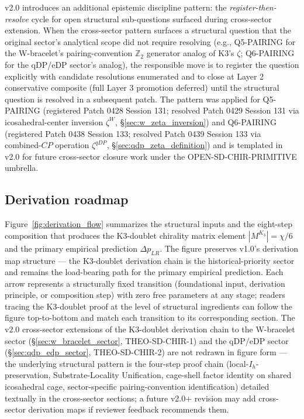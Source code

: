 \documentclass[11pt,letterpaper]{article}
\newcommand{\Kthree}{\ensuremath{K_3}}
\newcommand{\DeltapLR}{\Delta p_{LR}}
\begin{document}
v2.0 introduces an additional epistemic discipline pattern: the \emph{register-then-resolve} cycle for open structural sub-questions surfaced during cross-sector extension. When the cross-sector pattern surfaces a structural question that the original sector's analytical scope did not require resolving (e.g., Q5-PAIRING for the W-bracelet's pairing-convention $\mathbb{Z}_2$ generator analog of K3's $\zeta$; Q6-PAIRING for the qDP/eDP sector's analog), the responsible move is to register the question explicitly with candidate resolutions enumerated and to close at Layer 2 conservative composite (full Layer 3 promotion deferred) until the structural question is resolved in a subsequent patch. The pattern was applied for Q5-PAIRING (registered Patch 0428 Session 131; resolved Patch 0429 Session 131 via icosahedral-center inversion $\zeta^W$, \S\ref{sec:w_zeta_inversion}) and Q6-PAIRING (registered Patch 0438 Session 133; resolved Patch 0439 Session 133 via combined-$CP$ operation $\zeta^{qDP}$, \S\ref{sec:qdp_zeta_definition}) and is templated in v2.0 for future cross-sector closure work under the OPEN-SD-CHIR-PRIMITIVE umbrella.

\subsection{Derivation roadmap}\label{sec:roadmap}

Figure~\ref{fig:derivation_flow} summarizes the structural inputs and the eight-step composition that produces the K3-doublet chirality matrix element $|M^{\Kthree}| = \chi/6$ and the primary empirical prediction $\DeltapLR$. The figure preserves v1.0's derivation map structure --- the K3-doublet derivation chain is the historical-priority sector and remains the load-bearing path for the primary empirical prediction. Each arrow represents a structurally fixed transition (foundational input, derivation principle, or composition step) with zero free parameters at any stage; readers tracing the K3-doublet proof at the level of structural ingredients can follow the figure top-to-bottom and match each transition to its corresponding section. The v2.0 cross-sector extensions of the K3-doublet derivation chain to the W-bracelet sector (\S\ref{sec:w_bracelet_sector}, THEO-SD-CHIR-1) and the qDP/eDP sector (\S\ref{sec:qdp_edp_sector}, THEO-SD-CHIR-2) are not redrawn in figure form --- the underlying structural pattern is the four-step proof chain (local-$I_h$-preservation, Substrate-Locality Unification, cage-shell factor identity on shared icosahedral cage, sector-specific pairing-convention identification) detailed textually in the cross-sector sections; a future v2.0+ revision may add cross-sector derivation maps if reviewer feedback recommends them.
\end{document}
